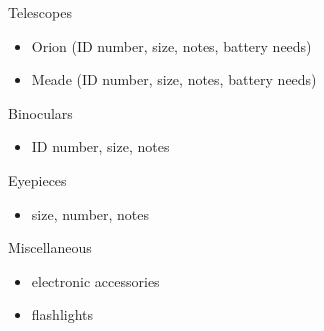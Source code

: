 
\noindent Telescopes
\begin{itemize}
\parskip 0pt
\parsep 0pt
\baselineskip 0pt
\item Orion (ID number, size, notes, battery needs)
\item Meade (ID number, size, notes, battery needs)
\end{itemize}

\noindent Binoculars
\begin{itemize}
\parskip 0pt
\parsep 0pt
\baselineskip 0pt
\item ID number, size, notes
\end{itemize}

\noindent Eyepieces
\begin{itemize}
\parskip 0pt
\parsep 0pt
\baselineskip 0pt
\item size, number, notes
\end{itemize}

\noindent Miscellaneous
\begin{itemize}
\parskip 0pt
\parsep 0pt
\baselineskip 0pt
\item electronic accessories
\item flashlights
\end{itemize}


